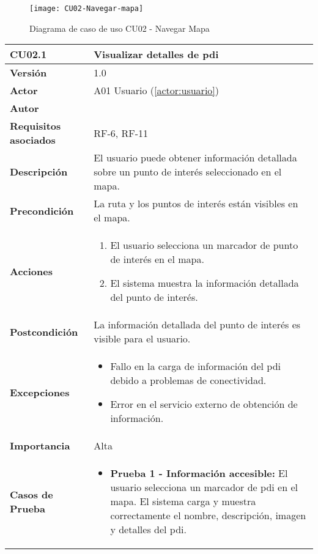 \begin{figure}[H]
	\centering
	\texttt{[image: CU02-Navegar-mapa]}
	\caption{Diagrama de caso de uso CU02 - Navegar Mapa}
	\label{CU02-Navegar-mapa}
\end{figure}



\begin{table}[H]
	\centering
	\begin{tabularx}{\linewidth}{ p{} p{} }
		\toprule
		\textbf{CU02.1}    & \textbf{Visualizar detalles de \acrfull{pdi}} \\
		\toprule
		\textbf{Versión}              & 1.0    \\
		\textbf{Actor}                & A01 Usuario (\ref{actor:usuario}) \\
		\textbf{Autor}                & \autor \\
		\textbf{Requisitos asociados} & RF-6, RF-11 \\
		\textbf{Descripción}          & El usuario puede obtener información detallada sobre un punto de interés seleccionado en el mapa. \\
		\textbf{Precondición}         & La ruta y los puntos de interés están visibles en el mapa. \\
		\textbf{Acciones}             &
		\begin{enumerate}
			\def\labelenumi{\arabic{enumi}.}
			\tightlist
			\item El usuario selecciona un marcador de punto de interés en el mapa.
			\item El sistema muestra la información detallada del punto de interés.
		\end{enumerate}\\
		\textbf{Postcondición}        & La información detallada del punto de interés es visible para el usuario. \\
		\textbf{Excepciones}          & 
		\begin{itemize}
			\tightlist
			\item Fallo en la carga de información del \acrlong{pdi} debido a problemas de conectividad.
			\item Error en el servicio externo de obtención de información.
		\end{itemize}\\
		\textbf{Importancia}          & Alta \\
		\textbf{Casos de Prueba}      &
		\begin{itemize}
			\item \textbf{Prueba 1 - Información accesible:} El usuario selecciona un marcador de \acrshort{pdi} en el mapa. El sistema carga y muestra correctamente el nombre, descripción, imagen y detalles del \acrlong{pdi}.

\end{itemize}
\end{tabularx}
\end{table}
